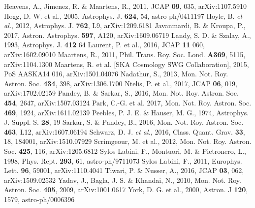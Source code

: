 \documentclass[useAMS,usenatbib]{mn2e}
\begin{document}
\begin{thebibliography}{99}
%
Heavens, A., Jimenez, R. \& Maartens, R., 2011, JCAP {\bf 09}, 035, arXiv:1107.5910 
%
Hogg, D. W. et al., 2005, Astrophys. J. {\bf 624}, 54, astro-ph/0411197
%
Hoyle, B. {\it et al.}, 2012, Astrophys. J. {\bf 762}, L9, arXiv:1209.6181 
%
Javanmardi, B. \& Kroupa, P., 2017, Astron. Astrophys. {\bf 597}, A120, arXiv:1609.06719
%
Landy, S. D. \& Szalay, A., 1993, Astrophys. J. {\bf 412} 64
%
Laurent, P. et al., 2016, JCAP {\bf 11} 060, arXiv:1602.09010  
%
Maartens, R., 2011, Phil. Trans. Roy. Soc. Lond. {\bf A369}, 5115, arXiv:1104.1300
%
Maartens, R. et al. [SKA Cosmology SWG Collaboration], 2015, PoS AASKA14 016, arXiv:1501.04076 
%
Nadathur, S., 2013, Mon. Not. Roy.  Astron. Soc. {\bf 434}, 398, arXiv:1306.1700 
%
Ntelis, P. et al., 2017, JCAP {\bf 06}, 019, arXiv:1702.02159
%
Pandey, B. \& Sarkar, S., 2016, Mon. Not. Roy. Astron. Soc. {\bf 454}, 2647, arXiv:1507.03124
%
Park, C.-G. et al. 2017, Mon. Not.  Roy. Astron. Soc. {\bf 469}, 1924, arXiv:1611.02139
%
Peebles, P. J. E. \&  Hauser, M. G., 1974, Astrophys. J. Suppl. S. {\bf 28}, 19
%
Sarkar, S. \& Pandey, B., 2016, Mon. Not. Roy. Astron. Soc. {\bf 463}, L12, arXiv:1607.06194 
%
Schwarz, D. J. {\it et al.}, 2016, Class. Quant. Grav. {\bf 33}, 18, 184001, arXiv:1510.07929
%
Scrimgeour, M. et al., 2012, Mon. Not. Roy. Astron. Soc. {\bf 425}, 116, arXiv:1205.6812 
%
Sylos Labini, F., Montuori, M. \& Pietronero, L., 1998, Phys. Rept. {\bf 293}, 61, astro-ph/9711073
%
Sylos Labini, F., 2011, Europhys. Lett. {\bf 96}, 59001, arXiv:1110.4041
%
Tiwari, P. \& Nusser, A., 2016, JCAP {\bf 03}, 062, arXiv:1509.02532   
%
Yadav, J., Bagla, J. S. \& Khandai, N., 2010, Mon. Not. Roy. Astron. Soc. {\bf  405}, 2009, arXiv:1001.0617
%
York, D. G. et al., 2000, Astron. J {\bf 120}, 1579, astro-ph/0006396


\end{thebibliography}
\end{document}
